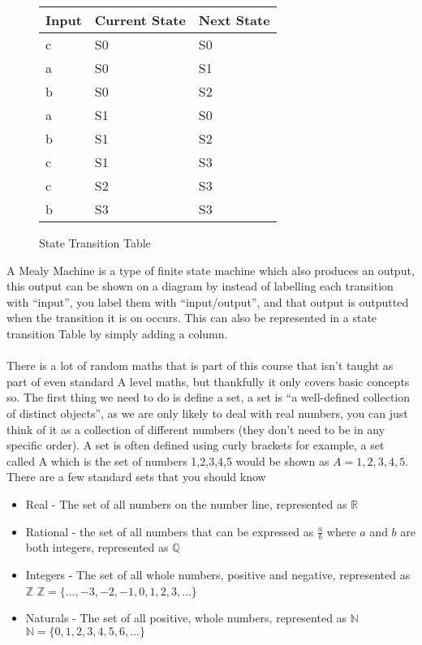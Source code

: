   \begin{figure}[H]
    \centering
    \begin{tabular}{| C{4cm} | C{4cm} | C{4cm} |}
      \hline
      Input & Current State & Next State \\
      \hline
      c & S0 & S0 \\
      a & S0 & S1 \\
      b & S0 & S2 \\
      a & S1 & S0 \\
      b & S1 & S2 \\
      c & S1 & S3 \\
      c & S2 & S3 \\
      b & S3 & S3 \\
      \hline
    \end{tabular}
    \caption*{State Transition Table}
  \end{figure}
  A Mealy Machine is a type of finite state machine which also produces an output, this output can be shown on a diagram by instead of labelling each transition with ``input'', you label them with ``input/output'', and that output is outputted when the transition it is on occurs. This can also be represented in a state transition Table by simply adding a column.\\ \\
  \noindent
  There is a lot of random maths that is part of this course that isn't taught as part of even standard A level maths, but thankfully it only covers basic concepts so. The first thing we need to do is define a set, a set is ``a well-defined collection of distinct objects'', as we are only likely to deal with real numbers, you can just think of it as a collection of different numbers (they don't need to be in any specific order). A set is often defined using curly brackets for example, a set called A which is the set of numbers 1,2,3,4,5 would be shown as $A = {1,2,3,4,5}$.
  There are a few standard sets that you should know
  \begin{itemize}
  	\item Real - The set of all numbers on the number line, represented as $\mathbb{R}$
  	\item Rational - the set of all numbers that can be expressed as $\frac{a}{b}$ where $a$ and $b$ are both integers, represented as $\mathbb{Q}$
  	\item Integers - The set of all whole numbers, positive and negative, represented as $\mathbb{Z}$
	  	\subitem $\mathbb{Z} = \{\dots,-3,-2,-1,0,1,2,3,\dots\}$
  	\item Naturals - The set of all positive, whole numbers, represented as $\mathbb{N}$
	  	\subitem $\mathbb{N} = \{0,1,2,3,4,5,6,\dots\}$
  \end{itemize}
  
